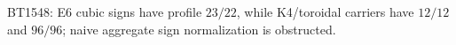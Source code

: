 \begin{center}\small
BT1548: E6 cubic signs have profile $23/22$, while K4/toroidal carriers have $12/12$ and $96/96$; naive aggregate sign normalization is obstructed.
\end{center}
